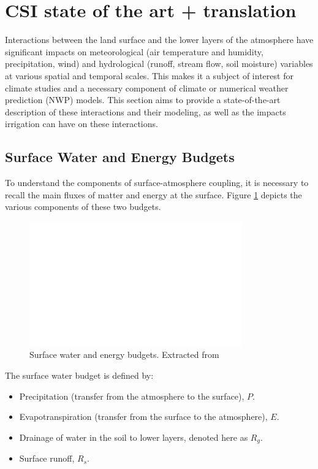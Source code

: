 \section{CSI state of the art + translation}

Interactions between the land surface and the lower layers of the atmosphere have significant impacts on meteorological (air temperature and humidity, precipitation, wind) and hydrological (runoff, stream flow, soil moisture) variables at various spatial and temporal scales. This makes it a subject of interest for climate studies and a necessary component of climate or numerical weather prediction (NWP) models. This section aims to provide a state-of-the-art description of these interactions and their modeling, as well as the impacts irrigation can have on these interactions.

\subsection{Surface Water and Energy Budgets}

To understand the components of surface-atmosphere coupling, it is necessary to recall the main fluxes of matter and energy at the surface. 
Figure \ref{fig:budgets} depicts the various components of these two budgets.

\begin{figure}[ht]
    \centering
    \includegraphics[width=\textwidth]{images/budgets_seneviratne.png}
    \caption{Surface water and energy budgets. Extracted from \cite{seneviratne_investigating_2010}}
    \label{fig:budgets}
\end{figure}

The surface water budget is defined by:
\begin{itemize}
    \item Precipitation (transfer from the atmosphere to the surface), $P$.
    \item Evapotranspiration (transfer from the surface to the atmosphere), $E$.
    \item Drainage of water in the soil to lower layers, denoted here as $R_g$.
    \item Surface runoff, $R_s$.
\end{itemize}


